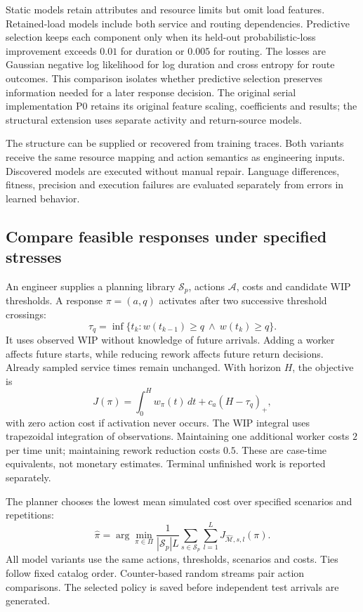 Static models retain attributes and resource limits but omit load features. Retained-load models include both service and routing dependencies. Predictive selection keeps each component only when its held-out probabilistic-loss improvement exceeds $0.01$ for duration or $0.005$ for routing. The losses are Gaussian negative log likelihood for log duration and cross entropy for route outcomes. This comparison isolates whether predictive selection preserves information needed for a later response decision. The original serial implementation P0 retains its original feature scaling, coefficients and results; the structural extension uses separate activity and return-source models.

The structure can be supplied or recovered from training traces. Both variants receive the same resource mapping and action semantics as engineering inputs. Discovered models are executed without manual repair. Language differences, fitness, precision and execution failures are evaluated separately from errors in learned behavior.

\subsection{Compare feasible responses under specified stresses}
An engineer supplies a planning library $\mathcal S_p$, actions $\mathcal A$, costs and candidate WIP thresholds. A response $\pi=(a,q)$ activates after two successive threshold crossings:
\begin{equation}\label{eq:trigger}
\tau_q=\inf\{t_k:w(t_{k-1})\geq q\ \land\ w(t_k)\geq q\}.
\end{equation}
It uses observed WIP without knowledge of future arrivals. Adding a worker affects future starts, while reducing rework affects future return decisions. Already sampled service times remain unchanged. With horizon $H$, the objective is
\begin{equation}\label{eq:cost}
J(\pi)=\int_0^H w_\pi(t)\,dt+c_a(H-\tau_q)_+,
\end{equation}
with zero action cost if activation never occurs. The WIP integral uses trapezoidal integration of observations. Maintaining one additional worker costs $2$ per time unit; maintaining rework reduction costs $0.5$. These are case-time equivalents, not monetary estimates. Terminal unfinished work is reported separately.

The planner chooses the lowest mean simulated cost over specified scenarios and repetitions:
\begin{equation}\label{eq:policy}
\widehat\pi=\arg\min_{\pi\in\Pi}\frac{1}{|\mathcal S_p|L}
\sum_{s\in\mathcal S_p}\sum_{l=1}^{L}J_{\widehat{\mathcal M},s,l}(\pi).
\end{equation}
All model variants use the same actions, thresholds, scenarios and costs. Ties follow fixed catalog order. Counter-based random streams pair action comparisons. The selected policy is saved before independent test arrivals are generated.

